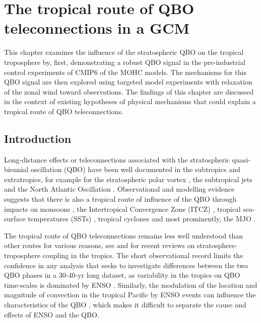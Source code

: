 \chapter{\label{ch:7-qbo} The tropical route of QBO teleconnections in a GCM }

This chapter examines the influence of the stratospheric QBO on the tropical troposphere by, first, demonstrating a robust QBO signal in the pre-industrial control experiments of CMIP6 of the MOHC models. The mechanisms for this QBO signal are then explored using targeted model experiments with relaxation of the zonal wind toward observations. The findings of this chapter are discussed in the context of existing hypotheses  of physical mechanisms that could explain a tropical route of QBO teleconnections.

\section{Introduction}

Long-distance effects or teleconnections associated with the stratospheric quasi-biennial oscillation (QBO) have been well documented in the subtropics and extratropics, for example for the stratospheric polar vortex \citep{holton1980,anstey2014,lu2020}, the subtropical jets \citep{garfinkel2011,hansen2016tropospheric,ma2021} and the North Atlantic Oscillation \citep{hansen2016tropospheric,gray2018,andrews2019observed}.  
 Observational and modelling evidence suggests that there is also a tropical route of influence of the QBO through impacts on monsoons \citep{giorgetta1999,claud2007revisiting,liess2012}, the Intertropical Convergence Zone (ITCZ) \citep{gray2018}, tropical sea-surface temperatures (SSTs) \citep{garfinkel2011,huang2012connection}, tropical cyclones \citep{ho2009,jaramillo2021combined} and most prominently, the MJO \citep{son2017,lee2018,wang2019,martin2021nature}.
 
The tropical route of QBO teleconnections remains less well understood than other routes for various reasons, see \cite{haynes2021influence} and \cite{hitchman2021observational} for recent reviews on stratosphere-troposphere coupling in the tropics. The short observational record limits the confidence in any analysis that seeks to investigate differences between the two QBO phases in a 30-40-yr long dataset, as variability in the tropics on QBO time-scales is dominated by ENSO \citep{liess2012,seo2013,gray2018}. Similarly, the modulation of the location and magnitude of convection in the tropical Pacific by ENSO events can influence the characteristics of the QBO \citep{taguchi2010,schirber2015,christiansen2016,serva2020}, which makes it difficult to separate the cause and effects of ENSO and the QBO. 



